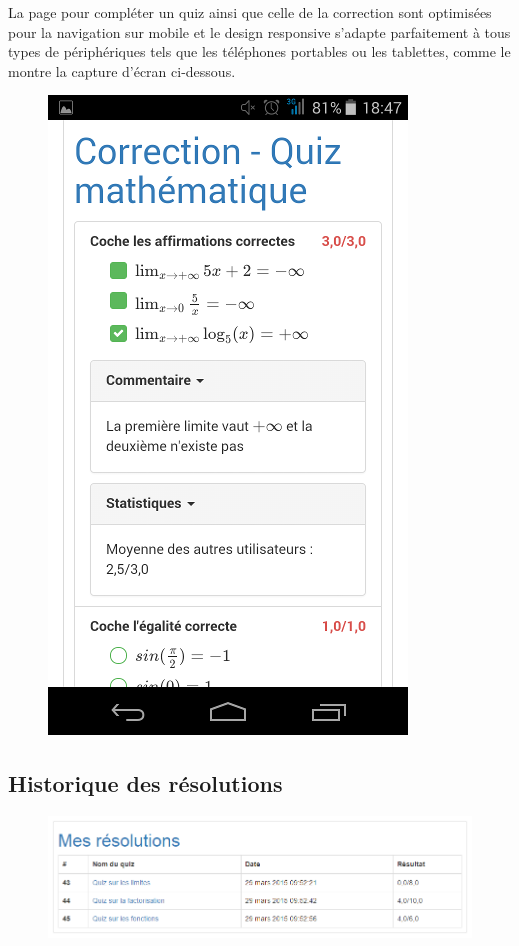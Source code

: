 \documentclass[a4,10pt,french]{sphinxmanual}
\begin{document}
La page pour compléter un quiz ainsi que celle de la correction sont optimisées pour la navigation sur mobile et le design responsive s'adapte parfaitement à tous types de périphériques tels que les téléphones portables ou les tablettes, comme le montre la capture d'écran ci-dessous.
\begin{figure}[htbp]
\centering

\includegraphics{mobile-1.png}
\end{figure}


\subsection{Historique des résolutions}
\label{doc-user:historique-des-resolutions}\begin{figure}[htbp]
\centering

\includegraphics{completed.png}
\end{figure}
\end{document}
